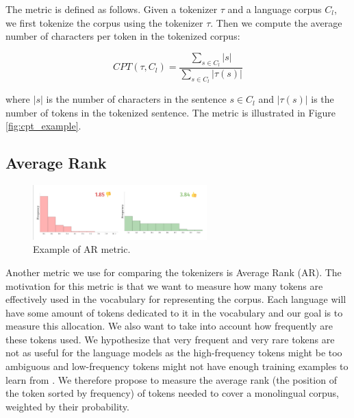 The metric is defined as follows. Given a tokenizer $\tau$ and a language corpus $C_l$, we first tokenize the corpus using the tokenizer $\tau$. Then we compute the average number of characters per token in the tokenized corpus:

\begin{equation}
    CPT(\tau, C_l) = \frac{\sum_{s \in C_l}|s|}{\sum_{s \in C_l}|\tau(s)|}
\end{equation}

where $|s|$ is the number of characters in the sentence $s \in C_l$ and $|\tau(s)|$ is the number of tokens in the tokenized sentence. The metric is illustrated in Figure \ref{fig:cpt_example}.

\subsection{Average Rank}

\begin{figure}[h]
    \centering
    \includegraphics[width=0.6\textwidth]{img/temp/ar_example.png}
    \caption{Example of AR metric.}
    \label{fig:ar_example}
\end{figure}

Another metric we use for comparing the tokenizers is Average Rank (AR). The motivation for this metric is that we want to measure how many tokens are effectively used in the vocabulary for representing the corpus. Each language will have some amount of tokens dedicated to it in the vocabulary and our goal is to measure this allocation. We also want to take into account how frequently are these tokens used. We hypothesize that very frequent and very rare tokens are not as useful for the language models as the high-frequency tokens might be too ambiguous and low-frequency tokens might not have enough training examples to learn from \cite{gowda_finding_2020}. We therefore propose to measure the average rank (the position of the token sorted by frequency) of tokens needed to cover a monolingual corpus, weighted by their probability.

